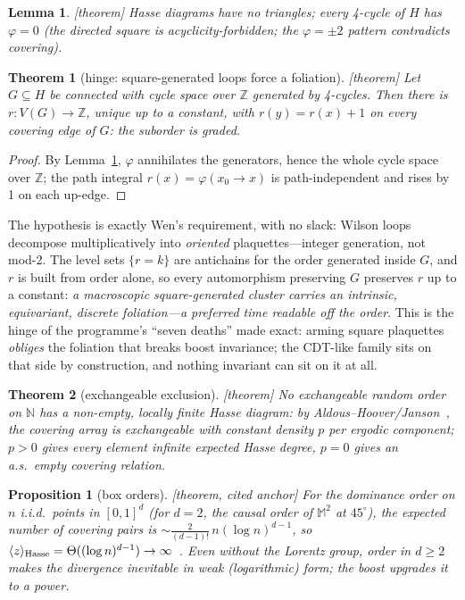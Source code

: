 \documentclass[aps,prd,reprint,nofootinbib,superscriptaddress,floatfix]{revtex4-2}
\newtheorem{theorem}{Theorem}
\newtheorem{lemma}{Lemma}
\newtheorem{proposition}{Proposition}
\theoremstyle{definition}
\begin{document}
\begin{lemma}
\label{lem:balanced}
{\rm[theorem]} Hasse diagrams have no triangles; every 4-cycle of $H$ has $\varphi=0$
(the directed square is acyclicity-forbidden; the $\varphi=\pm2$ pattern contradicts
covering).
\end{lemma}

\begin{theorem}[hinge: square-generated loops force a foliation]
\label{thm:T1}
{\rm[theorem]} Let $G\subseteq H$ be connected with cycle space over $\mathbb{Z}$
generated by 4-cycles. Then there is $r\colon V(G)\to\mathbb{Z}$, unique up to a
constant, with $r(y)=r(x)+1$ on every covering edge of $G$: the suborder is graded.
\end{theorem}

\begin{proof}
By Lemma~\ref{lem:balanced}, $\varphi$ annihilates the generators, hence the whole cycle
space over $\mathbb{Z}$; the path integral $r(x)=\varphi(x_0\!\to\!x)$ is
path-independent and rises by 1 on each up-edge.
\end{proof}

The hypothesis is exactly Wen's requirement, with no slack: Wilson loops decompose
multiplicatively into \emph{oriented} plaquettes---integer generation, not mod-2. The
level sets $\{r=k\}$ are antichains for the order generated inside $G$, and $r$ is
built from order alone, so every automorphism preserving $G$ preserves $r$ up to a
constant: \emph{a macroscopic square-generated cluster carries an intrinsic,
equivariant, discrete foliation---a preferred time readable off the order}. This is the
hinge of the programme's ``seven deaths'' made exact: arming square plaquettes
\emph{obliges} the foliation that breaks boost invariance; the CDT-like family sits on
that side by construction, and nothing invariant can sit on it at all.

\begin{theorem}[exchangeable exclusion]
\label{thm:T2}
{\rm[theorem]} No exchangeable random order on $\mathbb{N}$ has a non-empty, locally
finite Hasse diagram: by Aldous--Hoover/Janson~\cite{Janson2011}, the covering array is
exchangeable with constant density $p$ per ergodic component; $p>0$ gives every element
infinite expected Hasse degree, $p=0$ gives an a.s.\ empty covering relation.
\end{theorem}

\begin{proposition}[box orders]
\label{prop:T3}
{\rm[theorem, cited anchor]} For the dominance order on $n$ i.i.d.\ points in $[0,1]^d$ (for $d=2$,
the causal order of $\mathbb{M}^2$ at $45^\circ$), the expected number of covering pairs
is $\sim\frac{2}{(d-1)!}\,n(\log n)^{d-1}$, so
$\langle z\rangle_{\rm Hasse}=\Theta((\log n)^{d-1})\to\infty$~\cite{Brightwell1993}.
Even without the Lorentz group, order in $d\ge2$ makes the divergence inevitable in weak
(logarithmic) form; the boost upgrades it to a power.
\end{proposition}
\end{document}
